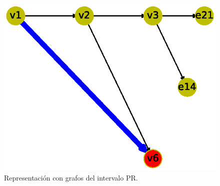 \documentclass{article}
\begin{document}
\begin{figure}
  \centering 
  \includegraphics[width=.8\columnwidth]{fig12.eps}
  \vspace*{-15mm}
  \caption{Representación con grafos del intervalo PR.}
  \label{Figura 12}
\end{figure}





\newpage


\end{document}
